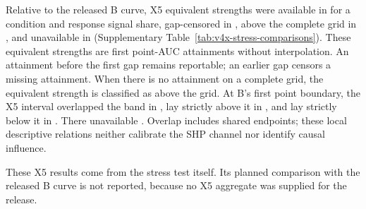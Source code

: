Relative to the released B curve, X5 equivalent strengths were available in   for a condition and response signal share, gap-censored in , above the complete grid in , and unavailable in  (Supplementary Table~\ref{tab:v4x-stress-comparisons}). %
These equivalent strengths are first point-AUC attainments without interpolation. An attainment before the first gap remains reportable; an earlier gap censors a missing attainment. When there is no attainment on a complete grid, the equivalent strength is classified as above the grid. %
At B's first point boundary, the X5 interval overlapped the band in  , lay strictly above it in , and lay strictly below it in . There   unavailable . %
Overlap includes shared endpoints; these local descriptive relations neither calibrate the SHP channel nor identify causal influence. %

These X5 results come from the stress test itself. Its planned comparison with the released B curve is not reported, because no X5 aggregate was supplied for the release. %

